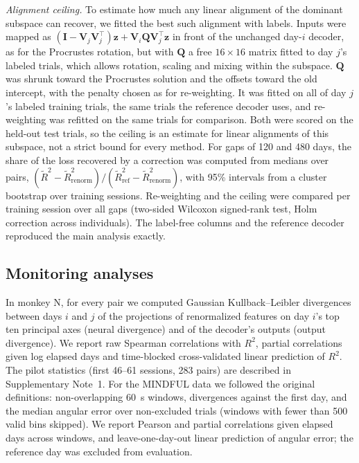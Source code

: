 \documentclass[pdflatex,sn-nature]{sn-jnl}
\begin{document}
\textit{Alignment ceiling.} To estimate how much any linear alignment of the dominant subspace can recover, we fitted
the best such alignment with labels. Inputs were mapped
as $(\mathbf{I} - \mathbf{V}_j\mathbf{V}_j^\top)\mathbf{z} + \mathbf{V}_i\mathbf{Q}\mathbf{V}_j^\top\mathbf{z}$ in front of
the unchanged day-$i$ decoder, as for the Procrustes rotation, but with $\mathbf{Q}$ a free $16 \times 16$ matrix fitted
to day $j$'s labeled trials, which allows rotation, scaling and mixing within the subspace. $\mathbf{Q}$ was shrunk toward
the Procrustes solution and the offsets toward the old intercept, with the penalty chosen as for re-weighting. It was
fitted on all of day $j$'s labeled training trials, the same trials the reference decoder uses, and re-weighting was
refitted on the same trials for comparison. Both were scored on the held-out test trials, so the ceiling is an estimate
for linear alignments of this subspace, not a strict bound for every method. For gaps of 120 and 480 days, the share of the loss recovered by a
correction was computed from medians over pairs, $(\tilde{R}^2 - \tilde{R}^2_{\text{renorm}})/(\tilde{R}^2_{\text{ref}}
- \tilde{R}^2_{\text{renorm}})$, with 95\% intervals from a cluster bootstrap over training sessions. Re-weighting and
the ceiling were compared per training session over all gaps (two-sided Wilcoxon signed-rank test, Holm correction
across individuals). The label-free columns and the reference decoder reproduced the main analysis exactly.

\subsection*{Monitoring analyses}

In monkey N, for every pair we computed Gaussian Kullback--Leibler divergences between days $i$ and $j$ of the
projections of renormalized features on day $i$'s top ten principal axes (neural divergence) and of the decoder's
outputs (output divergence). We report raw Spearman correlations with $R^2$, partial correlations given log elapsed days
and time-blocked cross-validated linear prediction of $R^2$. The pilot statistics (first 46--61 sessions, 283 pairs) are
described in Supplementary Note~1. For the MINDFUL data we followed the original definitions\cite{pun2024}:
non-overlapping 60~s windows, divergences against the first day, and the median angular error over non-excluded trials
(windows with fewer than 500 valid bins skipped). We report Pearson and partial correlations given elapsed days across
windows, and leave-one-day-out linear prediction of angular error; the reference day was excluded from evaluation.
\end{document}
